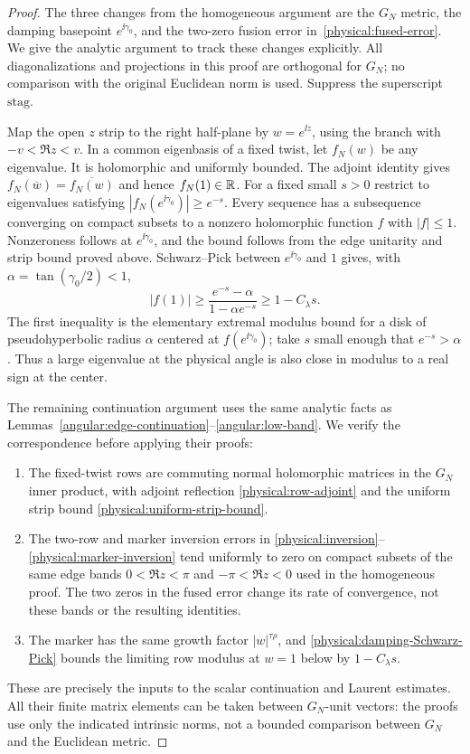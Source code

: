 \begin{proof}
The three changes from the homogeneous argument are the $G_N$ metric,
the damping basepoint $e^{\ii\gamma_0}$, and the two-zero fusion error
in~\eqref{physical:fused-error}. We give the analytic argument to track
these changes explicitly. All diagonalizations and projections
in this proof are orthogonal for $G_N$; no comparison with the original
Euclidean norm is used. Suppress the superscript $\mathrm{stag}$.

Map the open $z$ strip to the right half-plane by $w=e^{\ii z}$, using
the branch with $-v<\Re z<v$. In a common eigenbasis of a fixed twist,
let $f_N(w)$ be any eigenvalue. It is holomorphic and uniformly bounded.
The adjoint identity gives
$f_N(\overline w)=\overline{f_N(w)}$ and hence $f_N(1)\in\mathbb R$.
For a fixed small $s>0$ restrict to eigenvalues satisfying
$|f_N(e^{\ii\gamma_0})|\ge e^{-s}$.
Every sequence has a subsequence converging on compact subsets to a
nonzero holomorphic function $f$ with $|f|\le1$. Nonzeroness follows
at $e^{\ii\gamma_0}$, and the bound follows from the edge unitarity and
strip bound proved above. Schwarz--Pick between $e^{\ii\gamma_0}$ and
$1$ gives, with $\alpha=\tan(\gamma_0/2)<1$,
\begin{equation}\label{physical:damping-Schwarz-Pick}
 |f(1)|\ge\frac{e^{-s}-\alpha}{1-\alpha e^{-s}}
             \ge1-C_\lambda s.
\end{equation}
The first inequality is the elementary extremal modulus bound for a
disk of pseudohyperbolic radius $\alpha$ centered at $f(e^{\ii\gamma_0})$;
take $s$ small enough that $e^{-s}>\alpha$.
Thus a large eigenvalue at the physical angle is also close in modulus
to a real sign at the center.

The remaining continuation argument uses the same analytic facts as
Lemmas~\ref{angular:edge-continuation}--\ref{angular:low-band}.
We verify the correspondence before applying their proofs:
\begin{enumerate}[label=(\roman*)]
\item The fixed-twist rows are commuting normal holomorphic matrices
in the $G_N$ inner product, with adjoint reflection
\eqref{physical:row-adjoint} and the uniform strip bound
\eqref{physical:uniform-strip-bound}.
\item The two-row and marker inversion errors in
\eqref{physical:inversion}--\eqref{physical:marker-inversion} tend
uniformly to zero on compact subsets of the same edge bands
$0<\Re z<\pi$ and $-\pi<\Re z<0$ used in the homogeneous proof.
The two zeros in the fused error change its rate of convergence, not
these bands or the resulting identities.
\item The marker has the same growth factor $|w|^{\tau\rho}$, and
\eqref{physical:damping-Schwarz-Pick} bounds the limiting row modulus
at $w=1$ below by $1-C_\lambda s$.
\end{enumerate}
These are precisely the inputs to the scalar continuation and Laurent
estimates. All their finite matrix elements can be taken between
$G_N$-unit vectors: the proofs use only the indicated intrinsic norms,
not a bounded comparison between $G_N$ and the Euclidean metric.


\end{proof}

